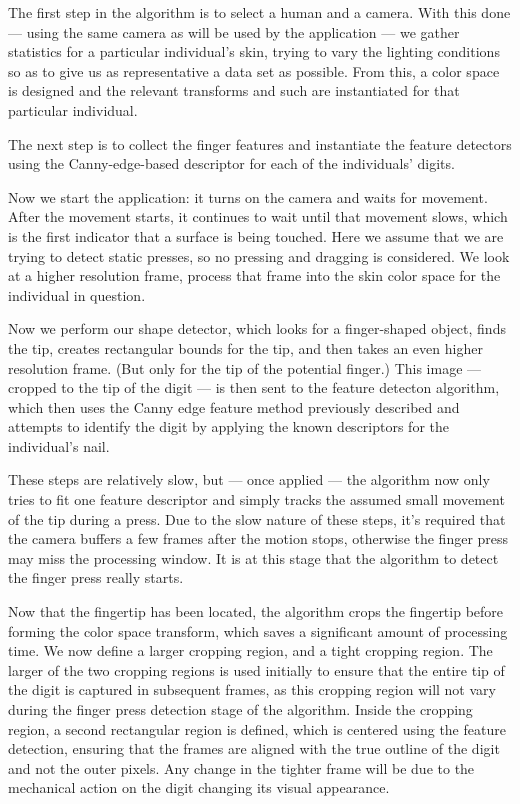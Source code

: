 The first step in the algorithm is to select a human and a camera. With this done --- using the same camera as will be used by the application --- we gather statistics for a particular individual's skin, trying to vary the lighting conditions so as to give us as representative a data set as possible. From this, a color space is designed and the relevant transforms and such are instantiated for that particular individual.

The next step is to collect the finger features and instantiate the feature detectors using the Canny-edge-based descriptor for each of the individuals' digits.

Now we start the application: it turns on the camera and waits for movement. After the movement starts, it continues to wait until that movement slows, which is the first indicator that a surface is being touched. Here we assume that we are trying to detect static presses, so no pressing and dragging is considered. We look at a higher resolution frame, process that frame into the skin color space for the individual in question. 

Now we perform our shape detector, which looks for a finger-shaped object, finds the tip, creates rectangular bounds for the tip, and then takes an even higher resolution frame. (But only for the tip of the potential finger.) This image --- cropped to the tip of the digit --- is then sent to the feature detecton algorithm, which then uses the Canny edge feature method previously described and attempts to identify the digit by applying the known descriptors for the individual's nail.

These steps are relatively slow, but --- once applied --- the algorithm now only tries to fit one feature descriptor and simply tracks the assumed small movement of the tip during a press. Due to the slow nature of these steps, it's required that the camera buffers a few frames after the motion stops, otherwise the finger press may miss the processing window. It is at this stage that the algorithm to detect the finger press really starts.

Now that the fingertip has been located, the algorithm crops the fingertip before forming the color space transform, which saves a significant amount of processing time. We now define a larger cropping region, and a tight cropping region. The larger of the two cropping regions is used initially to ensure that the entire tip of the digit is captured in subsequent frames, as this cropping region will not vary during the finger press detection stage of the algorithm. Inside the cropping region, a second rectangular region is defined, which is centered using the feature detection, ensuring that the frames are aligned with the true outline of the digit and not the outer pixels. Any change in the tighter frame will be due to the mechanical action on the digit changing its visual appearance.

